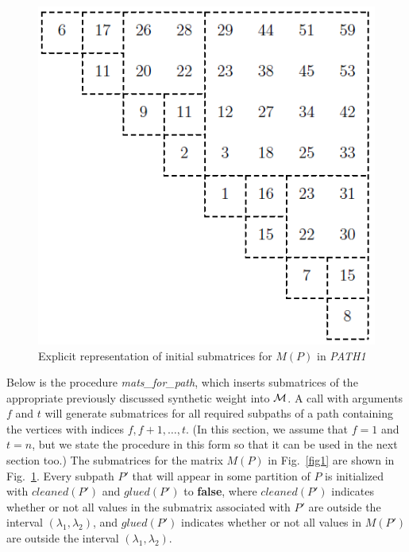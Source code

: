 {\dspace
\bigskip

\begin{figure}[thb]
\begin{center}
\includegraphics{fig3p1}
\end{center}
{\caption{\small Explicit representation of initial submatrices for $M(P)$ in {\it PATH1}}\label{fig3p1}}
\end{figure}

Below is the procedure {\it mats\_for\_path},
which inserts submatrices of the appropriate previously discussed synthetic weight into $\cal M$.
A call with arguments $f$ and $t$
will generate submatrices for all required subpaths of
a path containing the vertices with indices $f,f+1,\ldots ,t$.
(In this section, we assume that $f=1$ and $t=n$,
but we state the procedure in this form so that it can be used
in the next section too.)
The submatrices for the matrix $M(P)$ in Fig.~\ref{fig1}
are shown in Fig.~\ref{fig3p1}. 
Every subpath $P'$ that will appear in some partition of $P$
is initialized with $cleaned(P')$ and $glued(P')$ to {\bf false},
where $cleaned(P')$ indicates whether or not all values in
the submatrix associated with $P'$ are outside the interval
$(\lambda_1,\lambda_2)$,
and $glued(P')$ indicates whether or not all values in $M(P')$
are outside the interval $(\lambda_1,\lambda_2)$. \\

}
